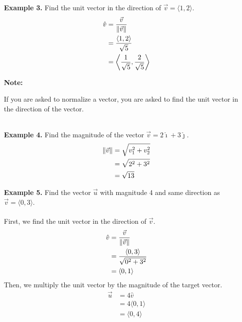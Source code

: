 \newpage
\noindent\textbf{Example 3. } Find the unit vector in the direction of $\vec{v} = \langle 1, 2 \rangle$.
\begin{align*}
    \hat{v} & = \frac{\vec{v}}{\left\lVert\vec{v}\right\rVert}                                    \\
            & = \frac{\langle 1, 2 \rangle}{\sqrt{5}}                             \\
            & = \left\langle \frac{1}{\sqrt{5}}, \frac{2}{\sqrt{5}} \right\rangle
\end{align*}
\begin{framed}
    \noindent\textbf{Note: }

    \noindent If you are asked to normalize a vector, you are asked to find the unit vector in the direction of the vector.
\end{framed}
~\\
\noindent\textbf{Example 4. } Find the magnitude of the vector $\vec{v} = 2\hat{\imath} + 3\hat{\jmath}$.
\begin{align*}
    \left\lVert\vec{v}\right\rVert & = \sqrt{v_1^2 + v_2^2} \\
                   & = \sqrt{2^2 + 3^2}     \\
                   & = \sqrt{13}
\end{align*}

\noindent\textbf{Example 5. } Find the vector $\vec{u}$ with magnitude 4 and same direction as $\vec{v} = \langle 0, 3 \rangle$.
~\\\\
\noindent First, we find the unit vector in the direction of $\vec{v}$.
\begin{align*}
    \hat{v} & = \frac{\vec{v}}{\left\lVert\vec{v}\right\rVert}                \\
            & = \frac{\langle 0, 3 \rangle}{\sqrt{0^2 + 3^2}} \\
            & = \langle 0, 1 \rangle
\end{align*}
Then, we multiply the unit vector by the magnitude of the target vector.
\begin{align*}
    \vec{u} & = 4\hat{v}              \\
            & = 4\langle 0, 1 \rangle \\
            & = \langle 0, 4 \rangle
\end{align*}